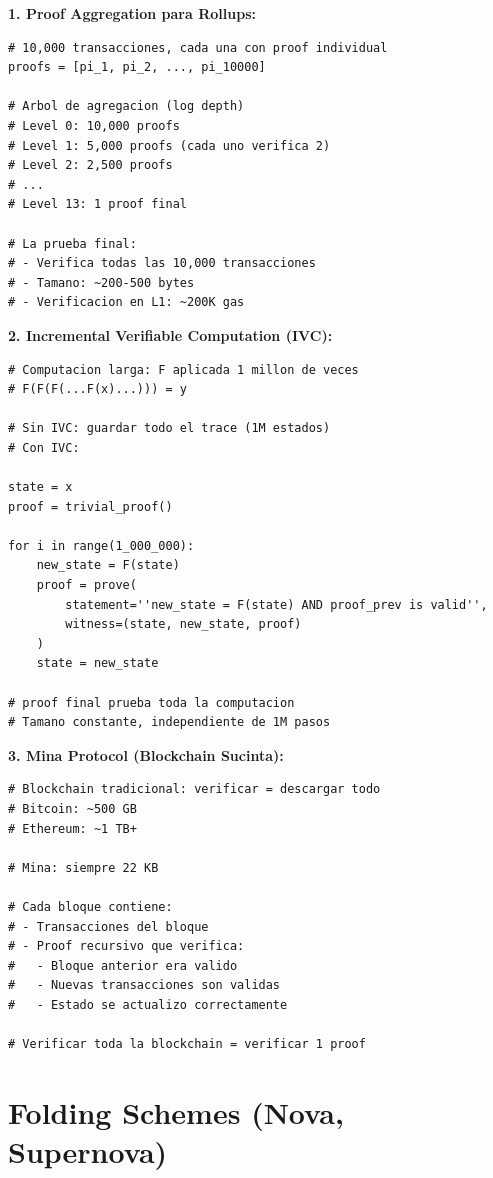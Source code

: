 \documentclass[11pt,a4paper,twoside]{book}
\begin{document}
\begin{example}
\textbf{1. Proof Aggregation para Rollups:}
\begin{lstlisting}[style=python]
# 10,000 transacciones, cada una con proof individual
proofs = [pi_1, pi_2, ..., pi_10000]

# Arbol de agregacion (log depth)
# Level 0: 10,000 proofs
# Level 1: 5,000 proofs (cada uno verifica 2)
# Level 2: 2,500 proofs
# ...
# Level 13: 1 proof final

# La prueba final:
# - Verifica todas las 10,000 transacciones
# - Tamano: ~200-500 bytes
# - Verificacion en L1: ~200K gas
\end{lstlisting}

\textbf{2. Incremental Verifiable Computation (IVC):}
\begin{lstlisting}[style=python]
# Computacion larga: F aplicada 1 millon de veces
# F(F(F(...F(x)...))) = y

# Sin IVC: guardar todo el trace (1M estados)
# Con IVC:

state = x
proof = trivial_proof()

for i in range(1_000_000):
    new_state = F(state)
    proof = prove(
        statement=''new_state = F(state) AND proof_prev is valid'',
        witness=(state, new_state, proof)
    )
    state = new_state

# proof final prueba toda la computacion
# Tamano constante, independiente de 1M pasos
\end{lstlisting}

\textbf{3. Mina Protocol (Blockchain Sucinta):}
\begin{lstlisting}[style=python]
# Blockchain tradicional: verificar = descargar todo
# Bitcoin: ~500 GB
# Ethereum: ~1 TB+

# Mina: siempre 22 KB

# Cada bloque contiene:
# - Transacciones del bloque
# - Proof recursivo que verifica:
#   - Bloque anterior era valido
#   - Nuevas transacciones son validas
#   - Estado se actualizo correctamente

# Verificar toda la blockchain = verificar 1 proof
\end{lstlisting}
\end{example}

\section{Folding Schemes (Nova, Supernova)}
\end{document}
